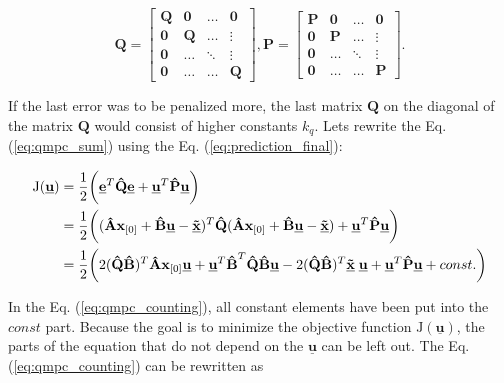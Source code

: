 \documentclass[a4paper,11pt,titlepage]{article}
\newcommand{\uvec}{\textbf{\underline{u}}}
\begin{document}
\begin{equation}
\label{eq:qmpc_weighting_matrices}
\textbf{\^Q} = \begin{bmatrix}
\textbf{Q} & \textbf{0} & \hdots & \textbf{0} \\
\textbf{0} & \textbf{Q} & \hdots & \vdots \\
\textbf{0} & \hdots & \ddots & \vdots \\
\textbf{0} & \hdots & \hdots & \textbf{Q}
\end{bmatrix},
\textbf{\^P} = \begin{bmatrix}
\textbf{P} & \textbf{0} & \hdots & \textbf{0} \\
\textbf{0} & \textbf{P} & \hdots & \vdots \\
\textbf{0} & \hdots & \ddots & \vdots \\
\textbf{0} & \hdots & \hdots & \textbf{P}
\end{bmatrix}.
\end{equation}

If the last error was to be penalized more, the last matrix $\textbf{Q}$ on the diagonal of the matrix $\textbf{\^Q}$ would consist of higher constants $k_q$. Lets rewrite the Eq. (\ref{eq:qmpc_sum}) using the Eq. (\ref{eq:prediction_final}):

\begin{equation}
\begin{split}
\label{eq:qmpc_counting}
\mathrm{J}(\underline{\textbf{u}}) 
&= \frac{1}{2}\bigg(\underline{\textbf{e}}^T 
\textbf{\^Q} \underline{\textbf{e}}+\underline{\textbf{u}}^T 
\textbf{\^P} \underline{\textbf{u}}\bigg)\\
&=\frac{1}{2}\bigg((\textbf{\^A}\textbf{x}_{[0]} + \textbf{\^B}	  \uvec-\underline{\textbf{\~x}})^T 
\textbf{\^Q}
(\textbf{\^A}\textbf{x}_{[0]} + \textbf{\^B}\uvec-\underline{\textbf{\~x}}) 
+\underline{\textbf{u}}^T 
\textbf{\^P} \underline{\textbf{u}}\bigg)\\
&=\frac{1}{2}\bigg(
2(\textbf{\^Q}\textbf{\^B})^T \textbf{\^A} \textbf{x}_{[0]} \underline{\textbf{u}}
+\uvec^T \textbf{\^B}^T\textbf{\^Q} \textbf{\^B}\uvec
-2(\textbf{\^Q}\textbf{\^B})^T \underline{\textbf{\~x}}\; \underline{\textbf{u}}
+\underline{\textbf{u}}^T 
\textbf{\^P} \underline{\textbf{u}}+const.\bigg)
\end{split}
\end{equation}

In the Eq. (\ref{eq:qmpc_counting}), all constant elements have been put into the $const$ part. Because the goal is to minimize the objective function $\mathrm{J}(\underline{\textbf{u}})$, the parts of the equation that do not depend on the $\underline{\textbf{u}}$ can be left out. The Eq. (\ref{eq:qmpc_counting}) can be rewritten as
\end{document}
